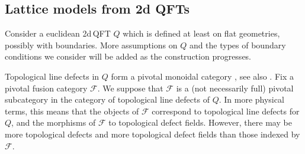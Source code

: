 \documentclass[11pt,a4paper]{article}
\numberwithin{equation}{section}
\begin{document}
\subsection{Lattice models from 2d QFTs}\label{sec:lattice-from-QFT}

Consider a euclidean 2d\,QFT $Q$ which is defined at least on flat geometries, possibly with boundaries. More assumptions on $Q$ and the types of boundary conditions we consider will be added as the construction progresses.

Topological line defects in $Q$ form a pivotal monoidal category \cite[Sec.\,2.4]{Davydov:2011kb}, see also \cite{Fuchs:2002cm,Frohlich:2006ch,Carqueville:2012dk,Bhardwaj:2017xup,Chang:2018iay,Thorngren:2021yso,Carqueville:2023jhb}.
Fix a pivotal fusion category $\mathcal{F}$. We suppose that $\mathcal{F}$ is a (not necessarily full) pivotal subcategory in the category of topological line defects of $Q$. In more physical terms, this means that the objects of $\mathcal{F}$ correspond to topological line defects for $Q$, and the morphisms of $\mathcal{F}$ to topological defect fields. However, there may be more topological defects and more topological defect fields than those indexed by $\mathcal{F}$.

\medskip
\end{document}
